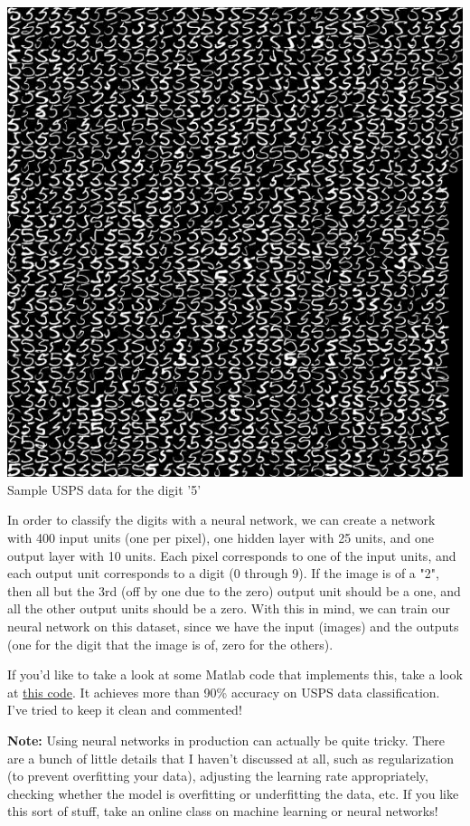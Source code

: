 \documentclass{article}
\begin{document}
\begin{center}
    \includegraphics[scale=0.5]{images/usps.jpg} \\
    Sample USPS data for the digit '5'
\end{center}

In order to classify the digits with a neural network, we can create a network with 400 input units
(one per pixel),  one hidden layer with 25 units, and one output layer with 10 units. Each pixel
corresponds to one of the input units, and each output unit corresponds to a digit (0 through 9). If
the image is of a "2", then all but the 3rd (off by one due to the zero) output unit should be a
one, and all the other output units should be a zero. With this in mind, we can train our neural
network on this dataset, since we have the input (images) and the outputs (one for the digit that
the image is of, zero for the others).

If you'd like to take a look at some Matlab code that implements this, take a look at \href{https://github.com/gibiansky/experiments/tree/master/neural-network}{this code}. It
achieves more than 90\% accuracy on USPS data classification. I've tried to keep it clean and
commented!

\textbf{Note:} Using neural networks in production can actually be quite tricky. There are a bunch of little
details that I haven't discussed at all, such as regularization (to prevent overfitting your data),
adjusting the learning rate appropriately, checking whether the model is overfitting or underfitting
the data, etc. If you like this sort of stuff, take an online class on machine learning or neural
networks!
\end{document}
